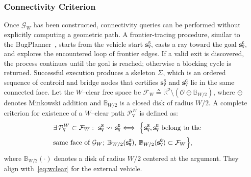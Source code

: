\subsubsection{Connectivity Criterion}\label{subsubsec:bugplanner}
Once $\mathcal{G}_W$ has been constructed, connectivity queries can be
performed without explicitly computing a geometric path. A frontier-tracing
procedure, similar to the BugPlanner~\cite{McGuireCroonTuyls2019}, starts from the vehicle start
$\mathbf{s}_\texttt{V}^{\texttt{S}}$, casts a ray toward the goal
$\mathbf{s}_\texttt{V}^{\texttt{G}}$, and explores the encountered loop of
frontier edges. If a valid exit is discovered, the process continues until the
goal is reached; otherwise a blocking cycle is returned. Successful execution
produces a skeleton $\Sigma$, which is an ordered sequence of centroid and
bridge nodes that certifies $\mathbf{s}_\texttt{V}^{\texttt{S}}$ and
$\mathbf{s}_\texttt{V}^{\texttt{G}}$ lie in the same connected face.
Let the $W$--clear free space be
$\mathcal{F}_W\triangleq\mathbb{R}^2\setminus(\mathcal{O}\oplus\mathbb{B}_{W/2})$,
where $\oplus$ denotes Minkowski addition and $\mathbb{B}_{W/2}$ is a closed
disk of radius $W/2$. A complete criterion for existence of a $W$--clear path
$\mathcal{P}^W_\texttt{V}$ is defined as:
\begin{equation}\label{eq:wccg_criterion}
\begin{aligned}
&\exists\,\mathcal{P}^W_\texttt{V}\subset\mathcal{F}_W:\
  \mathbf{s}_\texttt{V}^{\texttt{S}}\leadsto\mathbf{s}_\texttt{V}^{\texttt{G}} \Longleftrightarrow\
  \Big{\{}\mathbf{s}_\texttt{V}^{\texttt{S}},\mathbf{s}_\texttt{V}^{\texttt{G}}
  \ \text{belong to the} \\
  & \text{same face of }\mathcal{G}_W; \;\mathbb{B}_{W/2}(\mathbf{s}_\texttt{V}^{\texttt{S}}),
  \,\mathbb{B}_{W/2}(\mathbf{s}_\texttt{V}^{\texttt{G}})\subset\mathcal{F}_W\Big{\}},
\end{aligned}
\end{equation}
where $\mathbb{B}_{W/2}(\cdot)$ denotes a disk of radius $W/2$ centered at the
argument. They align with~\eqref{eq:wclear} for the external vehicle.

